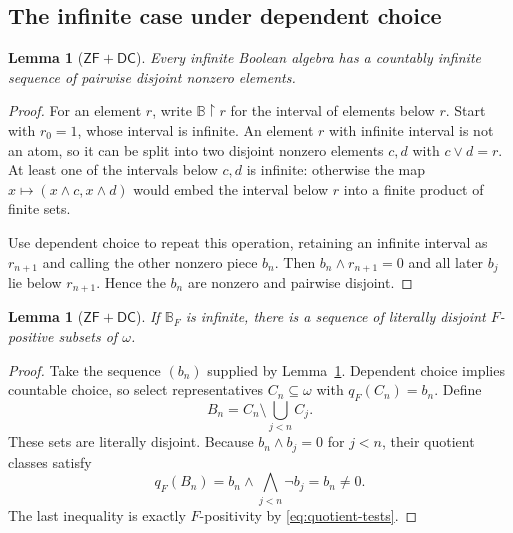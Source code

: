 \documentclass[11pt,letterpaper]{article}
\newtheorem{lemma}[theorem]{Lemma}
\theoremstyle{definition}
\theoremstyle{remark}
\newcommand{\om}{\omega}
\newcommand{\ZF}{\mathsf{ZF}}
\newcommand{\DC}{\mathsf{DC}}
\newcommand{\B}{\mathbb B}
\begin{document}
\subsection{The infinite case under dependent choice}

\begin{lemma}[$\ZF+\DC$]\label{lem:BA-antichain}
Every infinite Boolean algebra has a countably infinite sequence of
pairwise disjoint nonzero elements.
\end{lemma}
\begin{proof}
For an element $r$, write $\B\mathbin{\upharpoonright}r$ for the
interval of elements below $r$. Start with $r_0=1$, whose interval
is infinite. An element $r$ with infinite interval is not an atom, so
it can be split into two disjoint nonzero elements $c,d$ with
$c\vee d=r$. At least one of the intervals below $c,d$ is infinite:
otherwise the map $x\mapsto(x\wedge c,x\wedge d)$ would embed the
interval below $r$ into a finite product of finite sets.

Use dependent choice to repeat this operation, retaining an infinite
interval as $r_{n+1}$ and calling the other nonzero piece $b_n$.
Then $b_n\wedge r_{n+1}=0$ and all later $b_j$ lie below
$r_{n+1}$. Hence the $b_n$ are nonzero and pairwise disjoint.
\end{proof}

\begin{lemma}[$\ZF+\DC$]\label{lem:lift-antichain}
If $\B_F$ is infinite, there is a sequence of literally disjoint
$F$-positive subsets of $\om$.
\end{lemma}
\begin{proof}
Take the sequence $(b_n)$ supplied by Lemma~\ref{lem:BA-antichain}.
Dependent choice implies countable choice, so select representatives
$C_n\subseteq\om$ with $q_F(C_n)=b_n$. Define
\[
 B_n=C_n\setminus\bigcup_{j<n}C_j.
\]
These sets are literally disjoint. Because $b_n\wedge b_j=0$ for
$j<n$, their quotient classes satisfy
\[
 q_F(B_n)=b_n\wedge\bigwedge_{j<n}\neg b_j=b_n\neq0.
\]
The last inequality is exactly $F$-positivity by
\eqref{eq:quotient-tests}.
\end{proof}
\end{document}

